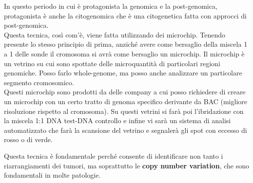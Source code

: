 \documentclass[11pt]{book}
\begin{document}
In questo periodo in cui è protagonista la genomica e la post-genomica, protagonista è anche la citogenomica che è una citogenetica fatta con approcci di post-genomica.\\
Questa tecnica, così com’è, viene fatta utilizzando dei microchip. Tenendo presente lo stesso principio di prima, anziché avere come bersaglio della miscela 1 a 1 delle sonde il cromosoma si avrà come bersaglio un microchip.
Il microchip è un vetrino su cui sono spottate delle microquantità di particolari regioni genomiche. Posso farlo whole-genome, ma posso anche analizzare un particolare segmento cromosomico.\\
Questi microchip sono prodotti da delle company a cui posso richiedere di creare un microchip con un certo tratto di genoma specifico derivante da BAC (migliore risoluzione rispetto al cromosoma). 
Su questi vetrini si farà poi l'ibridazione con la miscela 1:1 DNA test-DNA controllo e infine vi sarà un sistema di analisi automatizzato che farà la scansione del vetrino e segnalerà gli spot con eccesso di rosso o di verde.

Questa tecnica è fondamentale perché consente di identificare non tanto i riarrangiamenti dei tumori, ma soprattutto le \textbf{copy number variation}, che sono fondamentali in molte patologie.
\end{document}
